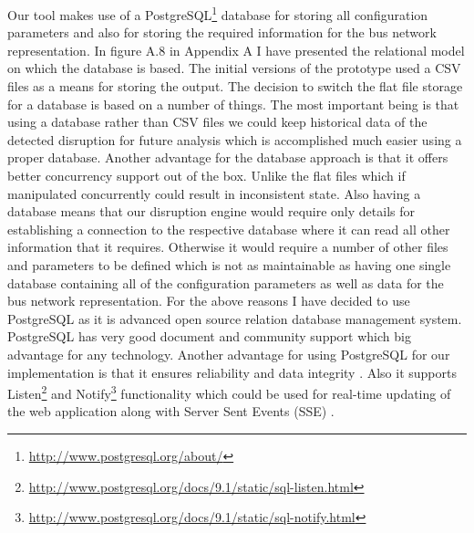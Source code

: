 Our tool makes use of a PostgreSQL\footnote{\url{http://www.postgresql.org/about/}} database for storing all configuration parameters and also for storing the required information for the bus network representation. In figure A.8 in Appendix A I have presented the relational model on which the database is based. The initial versions of the prototype used a CSV files as a means for storing the output. The decision to switch the flat file storage for a database is based on a number of things. The most important being is that using a database rather than CSV files we could keep historical data of the detected disruption for future analysis which is accomplished much easier using a proper database. Another advantage for the database approach is that it offers better concurrency support out of the box. Unlike the flat files which if manipulated concurrently could result in inconsistent state. Also having a database means that our disruption engine would require only details for establishing a connection to the respective database where it can read all other information that it requires. Otherwise it would require a number of other files and parameters to be defined which is not as maintainable as having one single database containing all of the configuration parameters as well as data for the bus network representation. For the above reasons I have decided to use PostgreSQL as it is advanced open source relation database management system. PostgreSQL has very good document and community support which big advantage for any technology. Another advantage for using PostgreSQL for our implementation is that it ensures reliability and data integrity \cite{lerner2007open}. Also it supports Listen\footnote{\url{http://www.postgresql.org/docs/9.1/static/sql-listen.html}} and Notify\footnote{\url{http://www.postgresql.org/docs/9.1/static/sql-notify.html}} functionality which could be used for real-time updating of the web application along with Server Sent Events (SSE) \cite{serverSentEvents}.

